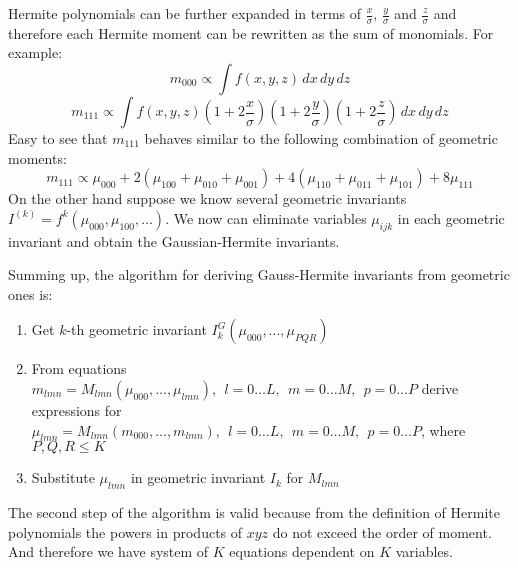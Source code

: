 Hermite polynomials can be further expanded in terms of $\frac{x}{\sigma}$, $\frac{y}{\sigma}$ and $\frac{z}{\sigma}$ and therefore each Hermite moment 
can be rewritten as the sum of monomials. For example:
$$m_{000} \propto  \int f(x,y,z) \, dx\, dy\, dz$$
$$m_{111} \propto  \int f(x,y,z) \left( 1 + 2\frac{x}{\sigma} \right)\left( 1 + 2\frac{y}{\sigma}\right)\left( 1 + 2\frac{z}{\sigma}\right)\, dx\, dy\, dz$$
Easy to see that $m_{111}$ behaves similar to the following combination of geometric moments:
$$m_{111}\propto \mu_{000} + 2\left(\mu_{100}+\mu_{010}+\mu_{001}\right) + 4\left(\mu_{110}+\mu_{011}+\mu_{101}\right) + 8\mu_{111}$$
On the other hand suppose we know several geometric invariants $I^(k) = f^k (\mu_{000},\mu_{100},\ldots)$. We now can eliminate variables $\mu_{ijk}$ in each
geometric invariant and obtain the Gaussian-Hermite invariants.

Summing up, the algorithm for deriving Gauss-Hermite invariants from geometric ones is:
\begin{enumerate}
 \item Get $k$-th geometric invariant $I_{k}^{G}(\mu_{000},...,\mu_{PQR})$
 \item From equations $m_{lmn}=M_{lmn}(\mu_{000},\ldots,\mu_{lmn}),~~ l=0\ldots L,~~ m=0 \ldots M,~~ p=0\ldots P$
  derive expressions for $\mu_{lmn}=M_{lmn}(m_{000},\ldots,m_{lmn}),~~ l=0\ldots L,~~ m=0 \ldots M,~~ p=0\ldots P$,
  where $P,Q,R \leq K$
 \item Substitute $\mu_{lmn}$ in geometric invariant $I_{k}$ for $M_{lmn}$
\end{enumerate}

The second step of the algorithm is valid because from the definition of Hermite polynomials the powers in products of $xyz$ do not exceed the order of moment. 
And therefore we have system of $K$ equations dependent on $K$ variables.

 